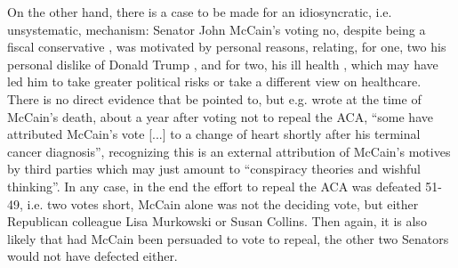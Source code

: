 \documentclass[11pt]{article}
\begin{document}
On the other hand, there is a case to be made for an idiosyncratic, i.e. unsystematic, mechanism: Senator John McCain's voting no, despite being a fiscal conservative \parencite[][]{McCain2008}, was motivated by personal reasons, relating, for one, two his personal dislike of Donald Trump \parencite[see e.g.][]{Everett2016}, and for two, his ill health \parencite[see][]{Davis2017}, which may have led him to take greater political risks or take a different view on healthcare. There is no direct evidence that be pointed to, but e.g. \textcite[][]{Huetteman2018} wrote at the time of McCain's death, about a year after voting not to repeal the ACA, \enquote{some have attributed McCain's vote [...] to a change of heart shortly after his terminal cancer diagnosis}, recognizing this is an external attribution of McCain's motives by third parties which may just amount to \enquote{conspiracy theories and wishful thinking}. In any case, in the end the effort to repeal the ACA was defeated 51-49, i.e. two votes short, McCain alone was not the deciding vote, but either Republican colleague Lisa Murkowski or Susan Collins. Then again, it is also likely that had McCain been persuaded to vote to repeal, the other two Senators would not have defected either.
\end{document}
